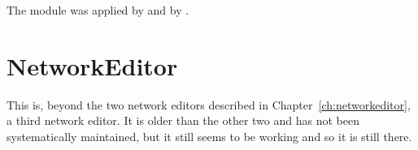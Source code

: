 The module was applied by \citet{CabritaEtcSustaincityHandbookBrusselsChapter} and by \citet[][]{ZoelligRenner_PhDThesis_2014}.

\section{NetworkEditor}
\label{sec:contrib-networkEditor}


This is, beyond the two network editors described in Chapter~\ref{ch:networkeditor}, a third network editor.  It is older than the other two and has not been systematically maintained, but it still seems to be working and so it is still there.


